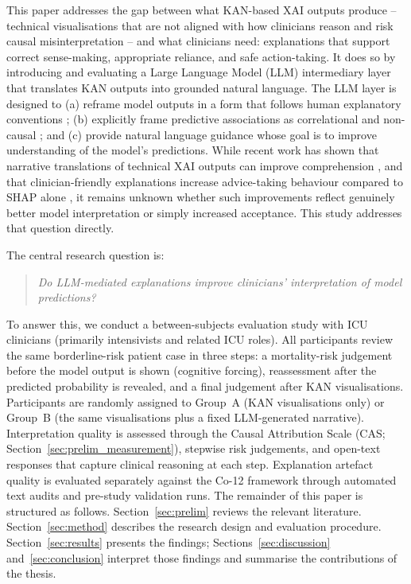 \documentclass[12pt, a4paper]{article}
\begin{document}
This paper addresses the gap between what KAN-based XAI outputs produce
-- technical visualisations that are not aligned with how clinicians reason and
risk causal misinterpretation -- and what
clinicians need: explanations that support correct sense-making,
appropriate reliance, and safe action-taking. It does so by introducing and
evaluating a Large Language Model (LLM) intermediary layer that
translates KAN outputs into grounded natural language. The LLM layer is designed to (a) reframe model
outputs in a form that follows human explanatory conventions
\citep{miller2019explanation, wang2019designing}; (b) explicitly frame
predictive associations as correlational and non-causal
\citep{janzing2020feature, karimi2021algorithmic}; and (c) provide natural
language guidance whose goal is to improve understanding of the model's predictions.
While recent work has shown that narrative translations of technical XAI
outputs can improve comprehension \citep{dams2025tell, lee2025prompt}, and
that clinician-friendly explanations increase advice-taking behaviour compared
to SHAP alone \citep{comparison2025shap}, it remains unknown whether such
improvements reflect genuinely better model interpretation or simply increased
acceptance. This study addresses that question directly.

The central research question is:
\begin{quote}
\emph{Do LLM-mediated explanations improve clinicians' interpretation of model
predictions?}
\end{quote}


To answer this, we conduct a between-subjects evaluation study with ICU
clinicians (primarily intensivists and related ICU roles). All participants
review the same borderline-risk patient case in three steps: a mortality-risk
judgement before the model output is shown (cognitive forcing), reassessment
after the predicted probability is revealed, and a final judgement after
KAN visualisations. Participants are randomly assigned to Group~A (KAN
visualisations only) or Group~B (the same visualisations plus a fixed
LLM-generated narrative). Interpretation quality is assessed through the
Causal Attribution Scale (CAS; Section~\ref{sec:prelim_measurement}),
stepwise risk judgements, and open-text responses that capture clinical
reasoning at each step. Explanation artefact quality is evaluated
separately against the Co-12 framework \citep{nauta2023anecdotal} through
automated text audits and pre-study validation runs.
The remainder of this paper is structured as follows. Section~\ref{sec:prelim}
reviews the relevant literature. Section~\ref{sec:method} describes the
research design and evaluation procedure. Section~\ref{sec:results} presents
the findings; Sections~\ref{sec:discussion} and~\ref{sec:conclusion} interpret
those findings and summarise the contributions of the thesis.
\end{document}
